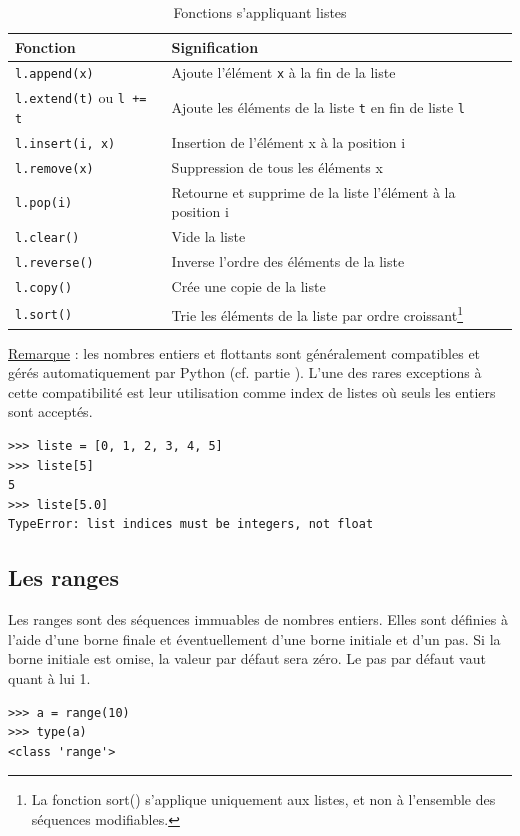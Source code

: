 \documentclass[12pt, a4paper]{article}
\begin{document}
\begin{table}[H]
	\begin{center}
		\begin{tabular}{|l|p{11cm}|}
			\hline
			\textbf{Fonction} & \textbf{Signification} \\
			\hline
			\lstinline{l.append(x)} & Ajoute l'élément \lstinline{x} à la fin de la liste \\
			\lstinline{l.extend(t)} ou \lstinline{l += t} & Ajoute les éléments de la liste \lstinline{t} en fin de liste \lstinline{l} \\
			\lstinline{l.insert(i, x)} & Insertion de l'élément x à la position i \\
			\lstinline{l.remove(x)} & Suppression de tous les éléments x \\
			\lstinline{l.pop(i)} & Retourne et supprime de la liste l'élément à la position i \\
			\lstinline{l.clear()} & Vide la liste \\
			\lstinline{l.reverse()} & Inverse l'ordre des éléments de la liste \\
			\lstinline{l.copy()} & Crée une copie de la liste \\
			\lstinline{l.sort()} & Trie les éléments de la liste par ordre croissant\footnote{La fonction sort() s'applique uniquement aux listes, et non à l'ensemble des séquences modifiables.} \\
			\hline
		\end{tabular}
		\caption{Fonctions s'appliquant listes}
		\label{tab:fonctions_listes}
	\end{center}
\end{table}


\underline{Remarque} : les nombres entiers et flottants sont généralement compatibles et gérés automatiquement par Python (cf. partie \label{sec:types_numeriques}). L'une des rares exceptions à cette compatibilité est leur utilisation comme index de listes où seuls les entiers sont acceptés.
\begin{lstlisting}
>>> liste = [0, 1, 2, 3, 4, 5]
>>> liste[5]
5
>>> liste[5.0]
TypeError: list indices must be integers, not float
\end{lstlisting}


\subsection{Les ranges}
Les ranges sont des séquences immuables de nombres entiers. Elles sont définies à l'aide d'une borne finale et éventuellement d'une borne initiale et d'un pas. Si la borne initiale est omise, la valeur par défaut sera zéro. Le pas par défaut vaut quant à lui 1.
\begin{lstlisting}
>>> a = range(10)
>>> type(a)
<class 'range'>
\end{lstlisting}
\end{document}
